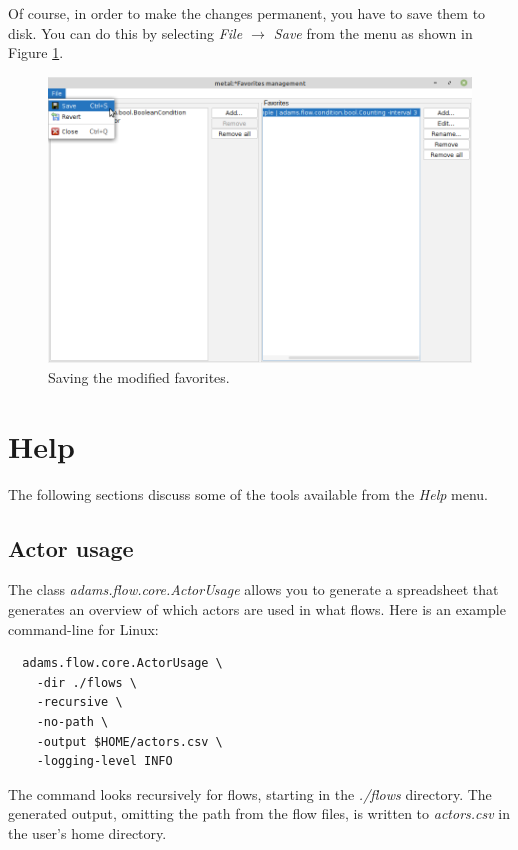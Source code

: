 \clearpage
{}
Of course, in order to make the changes permanent, you have to save them to 
disk. You can do this by selecting \textit{File $\rightarrow$ Save} from the
menu as shown in Figure \ref{favoritesmanagement-save}.

\begin{figure}[htb]
  \centering
  \includegraphics[width=12.0cm]{images/favoritesmanagement-save.png}
  \caption{Saving the modified favorites.}
  \label{favoritesmanagement-save}
\end{figure}


\chapter{Help}
The following sections discuss some of the tools available from the \textit{Help}
menu.

\section{Actor usage}
The class \textit{adams.flow.core.ActorUsage} allows you to generate a spreadsheet
that generates an overview of which actors are used in what flows. Here is an example
command-line for Linux:
\begin{verbatim}
  adams.flow.core.ActorUsage \
    -dir ./flows \
    -recursive \
    -no-path \
    -output $HOME/actors.csv \
    -logging-level INFO
\end{verbatim}
The command looks recursively for flows, starting in the \textit{./flows}
directory. The generated output, omitting the path from the flow files, is
written to \textit{actors.csv} in the user's home directory.

